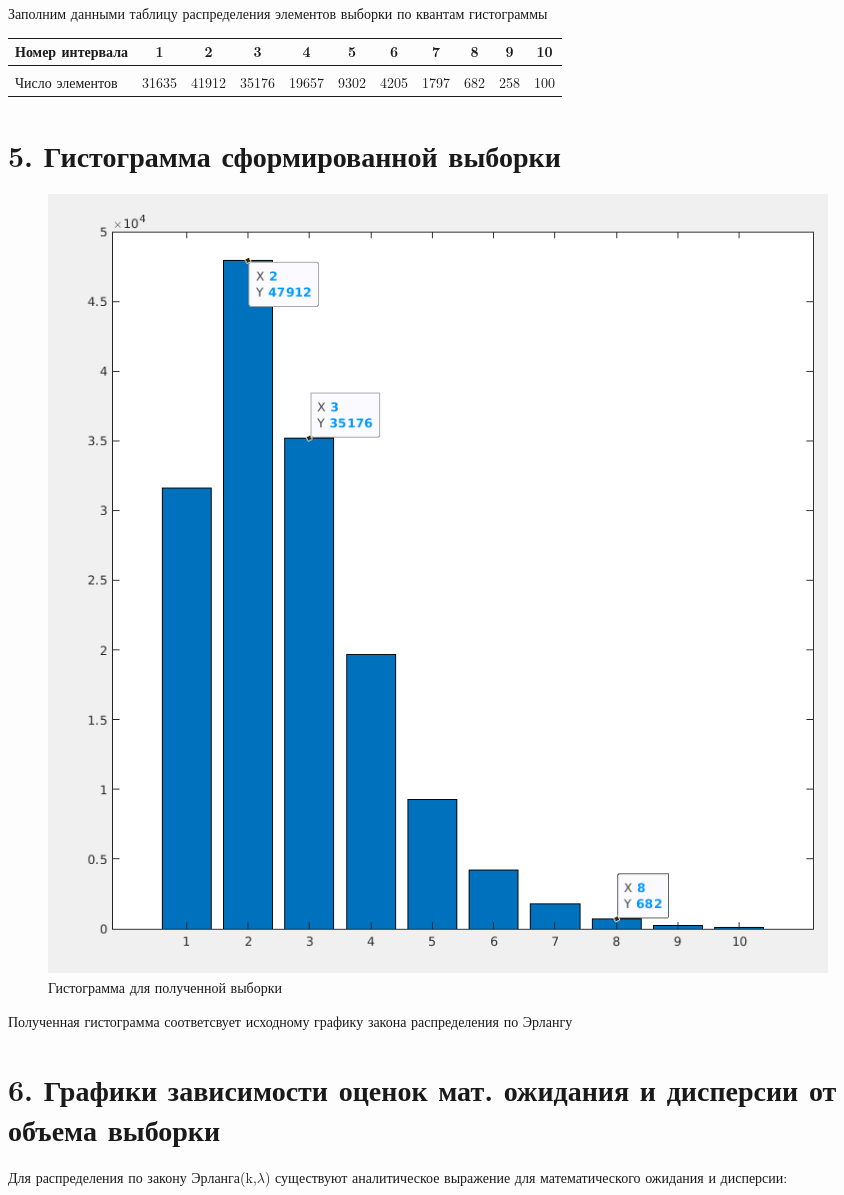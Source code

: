 \documentclass[12pt]{article}
\begin{document}
Заполним данными таблицу распределения элементов выборки по квантам гистограммы

\begin{center}
	\begin{tabular}[c]{l|cccccccccc}
  		Номер интервала & 1 & 2 & 3 & 4 & 5 & 6 & 7 & 8 & 9 & 10 \\\hline
  		&&&\\
		Число элементов & 31635 & 41912 & 35176 & 19657 & 9302 & 4205 & 1797 & 682 & 258 & 100\\
	\end{tabular}
\end{center}
 
 \section*{5. Гистограмма сформированной выборки}
 
\begin{figure}[!h]
	\centering
	\includegraphics[width=0.5\linewidth]{hist_example.png}
	\caption{Гистограмма для полученной выборки}
\end{figure}
Полученная гистограмма соответсвует исходному графику закона распределения по Эрлангу

\newpage
 \section*{6. Графики зависимости оценок мат. ожидания и дисперсии от объема выборки}
 

Для распределения по закону Эрланга(k,$\lambda$) существуют аналитическое выражение для математического ожидания и дисперсии:\\
\end{document}
